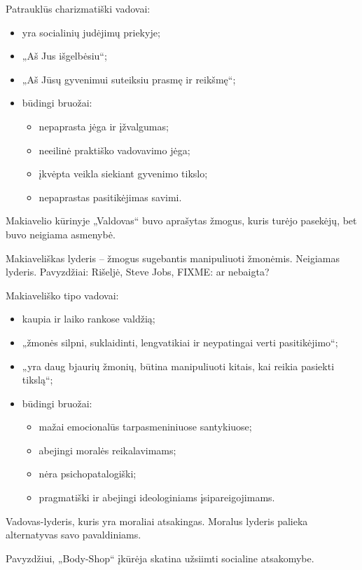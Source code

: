 Patrauklūs charizmatiški vadovai:
\begin{itemize}
  \item yra socialinių judėjimų priekyje;
  \item „Aš Jus išgelbėsiu“;
  \item „Aš Jūsų gyvenimui suteiksiu prasmę ir reikšmę“;
  \item būdingi bruožai:
    \begin{itemize}
      \item nepaprasta jėga ir įžvalgumas;
      \item neeilinė praktiško vadovavimo jėga;
      \item įkvėpta veikla siekiant gyvenimo tikslo;
      \item nepaprastas pasitikėjimas savimi.
    \end{itemize}
\end{itemize}

Makiavelio kūrinyje „Valdovas“ buvo aprašytas žmogus, kuris turėjo
pasekėjų, bet buvo neigiama asmenybė.

Makiaveliškas lyderis – žmogus sugebantis manipuliuoti žmonėmis.
Neigiamas lyderis. Pavyzdžiai: Rišeljė, Steve Jobs, FIXME: ar nebaigta?

Makiaveliško tipo vadovai:
\begin{itemize}
  \item kaupia ir laiko rankose valdžią;
  \item „žmonės silpni, suklaidinti, lengvatikiai ir neypatingai verti
    pasitikėjimo“;
  \item „yra daug bjaurių žmonių, būtina manipuliuoti kitais, kai reikia
    pasiekti tikslą“;
  \item būdingi bruožai:
    \begin{itemize}
      \item mažai emocionalūs tarpasmeniniuose santykiuose;
      \item abejingi moralės reikalavimams;
      \item nėra psichopatalogiški;
      \item pragmatiški ir abejingi ideologiniams įsipareigojimams.
    \end{itemize}
\end{itemize}

\begin{defn}
  Vadovas-lyderis, kuris yra moraliai atsakingas. Moralus lyderis
  palieka alternatyvas savo pavaldiniams.
  \begin{exmp}
    Pavyzdžiui, „Body-Shop“ įkūrėja skatina užsiimti socialine atsakomybe.
  \end{exmp}
\end{defn}

